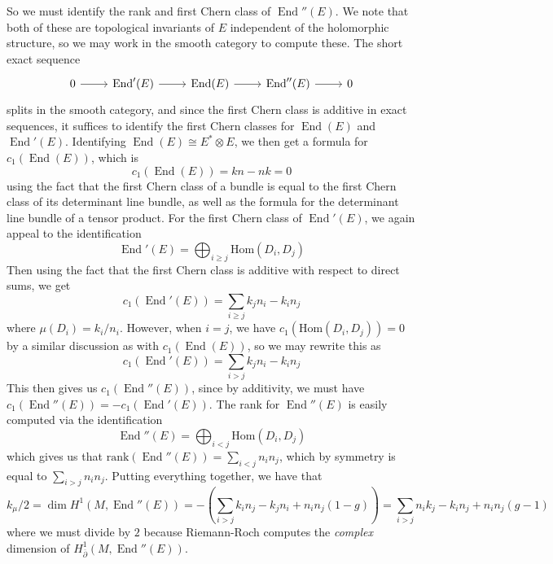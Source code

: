\documentclass[psamsfonts, 12pt]{amsart}
\theoremstyle{definition}
\theoremstyle{remark}
\renewcommand{\hom}{\mathrm{Hom}}
\newcommand{\dbar}{\overline{\partial}}
\DeclareMathOperator{\End}{End}
\begin{document}
So we must identify the rank and first Chern class of $\End''(E)$. We note that
both of these are topological invariants of $E$ independent of the holomorphic
structure, so we may work in the smooth category to compute these. The short
exact sequence
\[\begin{tikzcd}
0 \ar[r] & \End'(E) \ar[r] & \End(E) \ar[r] & \End''(E) \ar[r] & 0
\end{tikzcd}\]
splits in the smooth category, and since the first Chern class
is additive in exact sequences, it suffices to identify the first Chern classes
for $\End(E)$ and $\End'(E)$. Identifying $\End(E) \cong E^* \otimes E$,
we then get a formula for $c_1(\End(E))$, which is
\[
c_1(\End(E)) = kn - nk = 0
\]
using the fact that the first Chern class of a bundle is equal to the first Chern
class of its determinant line bundle, as well as the formula for the determinant
line bundle of a tensor product. For the first Chern class of $\End'(E)$, we
again appeal to the identification
\[
\End'(E) = \bigoplus_{i\geq j} \hom(D_i,D_j)
\]
Then using the fact that the first Chern class is additive with respect
to direct sums, we get
\[
c_1(\End'(E)) = \sum_{i \geq j} k_jn_i - k_in_j
\]
where $\mu(D_i) = k_i/n_i$. However, when $i = j$, we have $c_1(\hom(D_i,D_j)) = 0$ by
a similar discussion as with $c_1(\End(E))$, so we may rewrite this as
\[
c_1(\End'(E)) = \sum_{i > j} k_jn_i - k_in_j
\]
This then gives us $c_1(\End''(E))$, since by additivity, we must have
$c_1(\End''(E)) = - c_1(\End'(E))$. The rank for $\End''(E)$ is easily computed
via the identification
\[
\End''(E) = \bigoplus_{i < j}\hom(D_i,D_j)
\]
which gives us that $\mathrm{rank}(\End''(E)) = \sum_{i < j} n_in_j$, which by
symmetry is equal to $\sum_{i > j}n_in_j$. Putting everything together, we have that
\[
k_\mu/2 = \dim H^1(M,\End''(E))
= -\left( \sum_{i > j} k_in_j - k_jn_i + n_in_j(1-g)\right)
= \sum_{i > j}n_ik_j-k_in_j + n_in_j(g-1)
\]
where we must divide by $2$ because Riemann-Roch computes the \emph{complex} dimension
of $H^1_{\dbar}(M,\End''(E))$.
%
\end{document}
